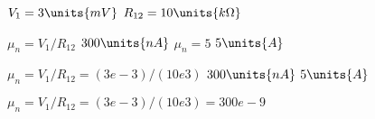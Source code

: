 
\mbox{$V_{1}=\mbox{$3 \units{m V}$}$} \mbox{$R_{12}=\mbox{$10 \units{k \Omega}$}$}

\mbox{$\mu_n=V_{1}/R_{12} $} \mbox{$300 \units{n A}$} \mbox{$\mu_n=5 $} \mbox{$5 \units{ A}$}

\mbox{$\mu_n=V_{1}/R_{12}  = (3e-3)/(10e3)$} \mbox{$300 \units{n A}$}  \mbox{$5 \units{ A}$}

\mbox{$\mu_n=V_{1}/R_{12}  = (3e-3)/(10e3) = 300e-9$}

